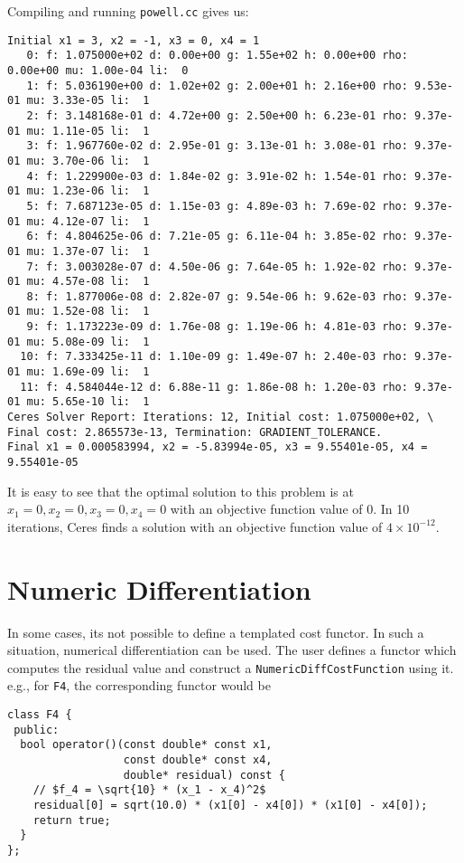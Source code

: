 Compiling and running \texttt{powell.cc} gives us:
\begin{verbatim}
Initial x1 = 3, x2 = -1, x3 = 0, x4 = 1
   0: f: 1.075000e+02 d: 0.00e+00 g: 1.55e+02 h: 0.00e+00 rho: 0.00e+00 mu: 1.00e-04 li:  0
   1: f: 5.036190e+00 d: 1.02e+02 g: 2.00e+01 h: 2.16e+00 rho: 9.53e-01 mu: 3.33e-05 li:  1
   2: f: 3.148168e-01 d: 4.72e+00 g: 2.50e+00 h: 6.23e-01 rho: 9.37e-01 mu: 1.11e-05 li:  1
   3: f: 1.967760e-02 d: 2.95e-01 g: 3.13e-01 h: 3.08e-01 rho: 9.37e-01 mu: 3.70e-06 li:  1
   4: f: 1.229900e-03 d: 1.84e-02 g: 3.91e-02 h: 1.54e-01 rho: 9.37e-01 mu: 1.23e-06 li:  1
   5: f: 7.687123e-05 d: 1.15e-03 g: 4.89e-03 h: 7.69e-02 rho: 9.37e-01 mu: 4.12e-07 li:  1
   6: f: 4.804625e-06 d: 7.21e-05 g: 6.11e-04 h: 3.85e-02 rho: 9.37e-01 mu: 1.37e-07 li:  1
   7: f: 3.003028e-07 d: 4.50e-06 g: 7.64e-05 h: 1.92e-02 rho: 9.37e-01 mu: 4.57e-08 li:  1
   8: f: 1.877006e-08 d: 2.82e-07 g: 9.54e-06 h: 9.62e-03 rho: 9.37e-01 mu: 1.52e-08 li:  1
   9: f: 1.173223e-09 d: 1.76e-08 g: 1.19e-06 h: 4.81e-03 rho: 9.37e-01 mu: 5.08e-09 li:  1
  10: f: 7.333425e-11 d: 1.10e-09 g: 1.49e-07 h: 2.40e-03 rho: 9.37e-01 mu: 1.69e-09 li:  1
  11: f: 4.584044e-12 d: 6.88e-11 g: 1.86e-08 h: 1.20e-03 rho: 9.37e-01 mu: 5.65e-10 li:  1
Ceres Solver Report: Iterations: 12, Initial cost: 1.075000e+02, \
Final cost: 2.865573e-13, Termination: GRADIENT_TOLERANCE.
Final x1 = 0.000583994, x2 = -5.83994e-05, x3 = 9.55401e-05, x4 = 9.55401e-05
\end{verbatim}
It is easy to see that the  optimal solution to this problem is at $x_1=0, x_2=0, x_3=0, x_4=0$ with an objective function value of $0$. In 10 iterations, Ceres finds a solution with an objective function value of $4\times 10^{-12}$.

\section{Numeric Differentiation}
In some cases, its not possible to define a templated cost functor. In such a situation, numerical differentiation can be used. The user defines a functor which computes the residual value and construct a \texttt{NumericDiffCostFunction} using it. e.g., for \texttt{F4}, the corresponding functor would be
\begin{verbatim}
class F4 {
 public:
  bool operator()(const double* const x1, 
                  const double* const x4, 
                  double* residual) const {
    // $f_4 = \sqrt{10} * (x_1 - x_4)^2$
    residual[0] = sqrt(10.0) * (x1[0] - x4[0]) * (x1[0] - x4[0]);
    return true;
  }
};
\end{verbatim}

